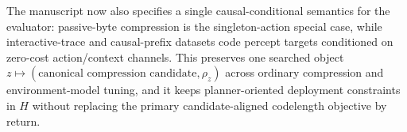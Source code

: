\documentclass[11pt]{article}
\begin{document}
The manuscript now also specifies a single causal-conditional semantics for the evaluator:
passive-byte compression is the singleton-action special case, while
interactive-trace and causal-prefix datasets code percept targets conditioned on
zero-cost action/context channels. This preserves one searched object
$z\mapsto(\text{canonical compression candidate},\rho_z)$ across ordinary
compression and environment-model tuning, and
it keeps planner-oriented deployment constraints in $H$ without replacing the
primary candidate-aligned codelength objective by return.
\end{document}
